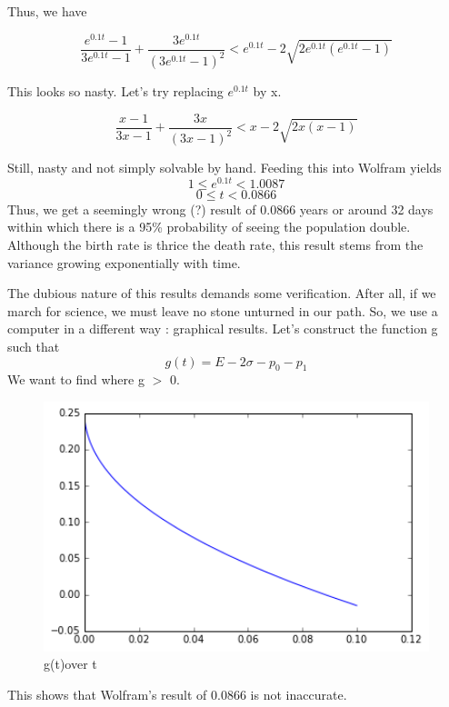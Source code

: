 \documentclass[a4paper,12pt]{article}
\begin{document}
Thus, we have 

\[\frac{e^{0.1t} -1}{3e^{0.1t} -1} +\frac{3e^{0.1t}}{(3e^{0.1t} -1)^2}<e^{0.1t} -2\sqrt{2e^{0.1t}(e^{0.1t}- 1)}\]

This looks so nasty. Let's try replacing $e^{0.1t}$ by x.

\[\frac{x -1}{3x -1} +\frac{3x}{(3x -1)^2}<x -2\sqrt{2x(x- 1)}\]

Still, nasty and not simply solvable by hand. Feeding this into Wolfram yields
\[1 \leq e^{0.1t} <1.0087\]
\[ 0 \leq t<0.0866\]
Thus, we get a seemingly wrong (?) result of 0.0866 years or around 32 days within which there is a 95\% probability of seeing the population double. Although the birth rate is thrice the death rate, this result stems from the variance growing exponentially with time.

The dubious nature of this results demands some verification. After all, if we march for science, we must leave no stone unturned in our path. So, we use a computer in a different way : graphical results. 
Let's construct the function g such that
\[g(t)= E- 2\sigma-p_0 - p_1 \]
We want to find where g $>$ 0.
\begin{figure}[H] 
	\centering
	\includegraphics[width=14cm]{37}
	\caption{g(t)over t}
	\end{figure}

This shows that Wolfram's result of 0.0866 is not inaccurate.  
\end{document}
